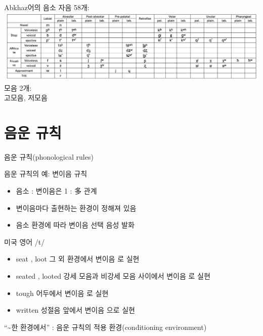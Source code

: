 \documentclass[11pt, aspectratio=169]{beamer}
\newcommand{\textds}[1]{{\ipafont #1}}
\begin{document}
\begin{frame}[t]{Abkhaz어의 음소}
    자음 58개: \\
    \includegraphics[width=1.0\textwidth]{img/Abkhaz_consonant_chart.png}\\
    모음 2개: \\
    고모음, 저모음
\end{frame}

\section{음운 규칙}

\begin{frame}[t]{음운 규칙(phonological rules)}
    \begin{block}{음운 규칙의 예: 변이음 규칙}
        \begin{itemize}
            \item 음소 : 변이음은 1 : 多 관계
            \item 변이음마다 출현하는 환경이 정해져 있음
            \item 음소 \rightarrow 환경에 따라 변이음 선택 \rightarrow 음성 발화
        \end{itemize}        
    \end{block}
    \begin{block}{미국 영어 \textds{/t/}}
        \begin{itemize}
            \item seat \textds{[sit]}, loot \textds{[lut]} \leftarrow 그 외 환경에서 변이음 \textds{[t]}로 실현
            \item seated \textds{[siɾəd]}, looted \textds{[luɾəd]} \leftarrow 강세 모음과 비강세 모음 사이에서 변이음 \textds{[ɾ]}로 실현
            \item tough \textds{[tʰʌf]} \leftarrow 어두에서 변이음 \textds{[tʰ]}로 실현
            \item written \textds{[rɪʔn̩]} \leftarrow 성절음 \textds{[n̩]} 앞에서 변이음 \textds{[ʔ]}으로 실현
        \end{itemize}
    \end{block}
    “\textasciitilde 한 환경에서” : 음운 규칙의 적용 환경(conditioning environment)
\end{frame}
\end{document}
